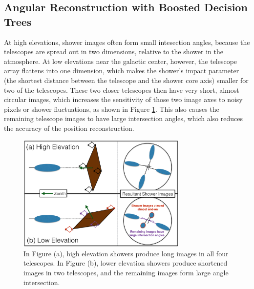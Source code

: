   \subsection{Angular Reconstruction with Boosted Decision Trees}\label{subsec:disp}
    At high elevations, shower images often form small intesection angles, because the telescopes are spread out in two dimensions, relative to the shower in the atmosphere.
    At low elevations near the galactic center, however, the telescope array flattens into one dimension, which makes the shower's impact parameter (the shortest distance between the telescope and the shower core axis) smaller for two of the telescopes.
    These two closer telescopes then have very short, almost circular images, which increases the sensitivity of those two image axes to noisy pixels or shower fluctuations, as shown in Figure \ref{fig:showerhighlowelev}.
    This also causes the remaining telescope images to have large intersection angles, which also reduces the accuracy of the position reconstruction.

    \begin{figure}[ht]
      \centering
      \includegraphics[width=0.75\textwidth]{images/high_elevation_vs_low_shower_images_cropped.eps}
      \caption[Shower Images at High and Low Elevations]{
        In Figure (a), high elevation showers produce long images in all four telescopes.
        In Figure (b), lower elevation showers produce shortened images in two telescopes, and the remaining images form large angle intersection.
      }
      \label{fig:showerhighlowelev}
    \end{figure}

